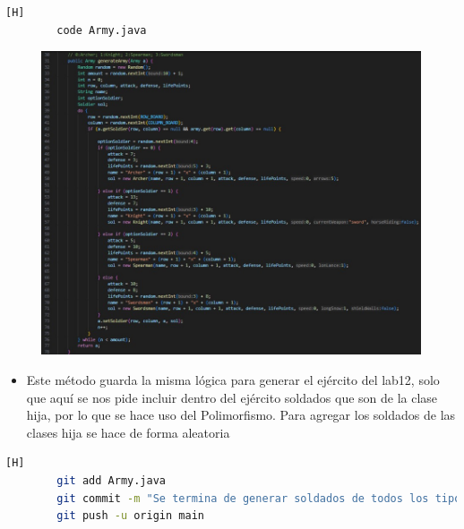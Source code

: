 \documentclass{article}
\begin{document}
	\begin{lstlisting}[language=bash,caption={Se crea generateArmy}][H]
		code Army.java
	\end{lstlisting}
	\begin{figure}[H]
		\centering
		\includegraphics[width=1\textwidth,keepaspectratio]{img/generateArmy.jpg}
	\end{figure}
	\begin{itemize}	
		\item Este método guarda la misma lógica para generar el ejército del lab12, solo que aquí se nos pide incluir dentro del ejército soldados que son de la clase hija, por lo que se hace uso del Polimorfismo. Para agregar los soldados de las clases hija se hace de forma aleatoria 
	\end{itemize}	
	\begin{lstlisting}[language=bash,caption={Commit: cd5e2d1a4c71b2db3ae28978a840f7c4ff318738 }][H]
		git add Army.java
		git commit -m "Se termina de generar soldados de todos los tipos por ejercito"			
		git push -u origin main
	\end{lstlisting}
	
	
	
	
	
\end{document}
